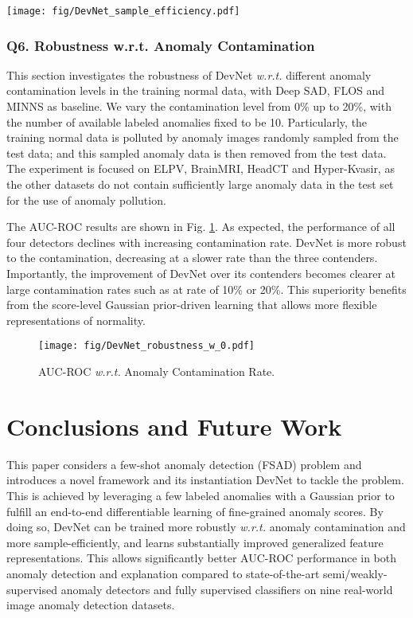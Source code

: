 \documentclass[10pt,journal,compsoc]{IEEEtran}
\begin{document}
\begin{figure*}[h!]
  \centering
    \texttt{[image: fig/DevNet\_sample\_efficiency.pdf]}
  \caption{AUC-ROC Performance \textit{w.r.t.} Different Number of Labeled Anomaly Examples Used.}
  \label{fig:sample_efficiency}
\end{figure*}


\subsubsection{Q6. Robustness w.r.t. Anomaly Contamination}

This section investigates the robustness of DevNet \textit{w.r.t.} different anomaly contamination levels in the training normal data, with Deep SAD, FLOS and MINNS as baseline. We vary the contamination level from 0\% up to 20\%, with the number of available labeled anomalies fixed to be 10. Particularly, the training normal data is polluted by anomaly images randomly sampled from the test data; and this sampled anomaly data is then removed from the test data. The experiment is focused on ELPV, BrainMRI, HeadCT and Hyper-Kvasir, as the other datasets do not contain sufficiently large anomaly data in the test set for the use of anomaly pollution.

The AUC-ROC results are shown in Fig. \ref{fig:image_robustness}. As expected, the performance of all four detectors declines with increasing contamination rate. DevNet is more robust to the contamination, decreasing at a slower rate than the three contenders. Importantly, the improvement of DevNet over its contenders becomes clearer at large contamination rates such as at rate of 10\% or 20\%. This superiority benefits from the score-level Gaussian prior-driven learning that allows more flexible representations of normality.

\begin{figure}[h!]
  \centering
    \texttt{[image: fig/DevNet\_robustness\_w\_0.pdf]}
  \caption{AUC-ROC \textit{w.r.t.} Anomaly Contamination Rate.}
  \label{fig:image_robustness}
\end{figure}




\section{Conclusions and Future Work}

This paper considers a few-shot anomaly detection (FSAD) problem and introduces a novel framework and its instantiation DevNet to tackle the problem. This is achieved by leveraging a few labeled anomalies with a Gaussian prior to fulfill an end-to-end differentiable learning of fine-grained anomaly scores. By doing so, DevNet can be trained more robustly \textit{w.r.t.} anomaly contamination and more sample-efficiently, and learns substantially improved generalized feature representations. This allows significantly better AUC-ROC performance in both anomaly detection and explanation compared to state-of-the-art semi/weakly-supervised anomaly detectors and fully supervised classifiers on nine real-world image anomaly detection datasets. 
\end{document}
